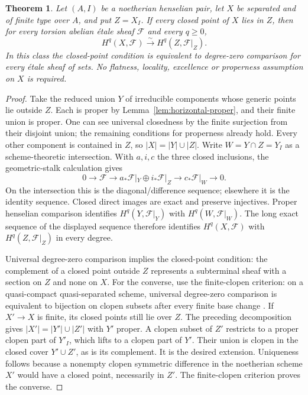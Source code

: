\documentclass[11pt,a4paper]{article}
\newtheorem{theorem}{Theorem}[section]
\theoremstyle{definition}
\begin{document}
\begin{theorem}\label{thm:noetherian-rigidity}
Let $(A,I)$ be a noetherian henselian pair, let $X$ be separated and of finite type over $A$, and put $Z=X_I$. If every closed point of $X$ lies in $Z$, then for every torsion abelian étale sheaf $\mathcal F$ and every $q\ge0$,
\[
 H^q(X,\mathcal F)\xrightarrow{\sim}H^q(Z,\mathcal F|_Z).
\]
In this class the closed-point condition is equivalent to degree-zero comparison for every étale sheaf of sets. No flatness, locality, excellence or properness assumption on $X$ is required.
\end{theorem}
\begin{proof}
Take the reduced union $Y$ of irreducible components whose generic points lie outside $Z$. Each is proper by Lemma~\ref{lem:horizontal-proper}, and their finite union is proper. One can see universal closedness by the finite surjection from their disjoint union; the remaining conditions for properness already hold. Every other component is contained in $Z$, so $|X|=|Y|\cup|Z|$. Write $W=Y\cap Z=Y_I$ as a scheme-theoretic intersection. With $a,i,c$ the three closed inclusions, the geometric-stalk calculation gives
\[
 0\longrightarrow\mathcal F\longrightarrow
 a_*\mathcal F|_Y\oplus i_*\mathcal F|_Z
 \longrightarrow c_*\mathcal F|_W\longrightarrow0.
\]
On the intersection this is the diagonal/difference sequence; elsewhere it is the identity sequence. Closed direct images are exact and preserve injectives. Proper henselian comparison identifies $H^q(Y,\mathcal F|_Y)$ with $H^q(W,\mathcal F|_W)$. The long exact sequence of the displayed sequence therefore identifies $H^q(X,\mathcal F)$ with $H^q(Z,\mathcal F|_Z)$ in every degree.

Universal degree-zero comparison implies the closed-point condition: the complement of a closed point outside $Z$ represents a subterminal sheaf with a section on $Z$ and none on $X$.
For the converse, use the finite-clopen criterion: on a quasi-compact quasi-separated scheme, universal degree-zero comparison is equivalent to bijection on clopen subsets after every finite base change \cite[Proposition~5.4, author pp.~18--19]{HallRydh}. If $X'\to X$ is finite, its closed points still lie over $Z$. The preceding decomposition gives $|X'|=|Y'|\cup|Z'|$ with $Y'$ proper. A clopen subset of $Z'$ restricts to a proper clopen part of $Y'_I$, which lifts to a clopen part of $Y'$. Their union is clopen in the closed cover $Y'\cup Z'$, as is its complement. It is the desired extension. Uniqueness follows because a nonempty clopen symmetric difference in the noetherian scheme $X'$ would have a closed point, necessarily in $Z'$. The finite-clopen criterion proves the converse.
\end{proof}
\end{document}
